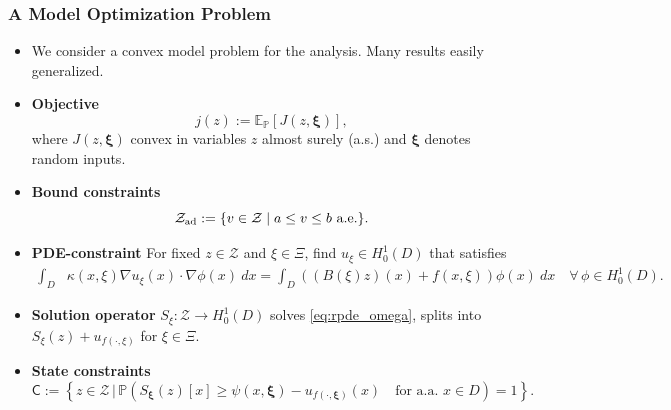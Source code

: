 \documentclass[aspectratio=169,xcolor=dvipsnames,11pt]{beamer}
\newcommand{\dd}{\:d}
\newcommand{\dif}{\dd}
\renewcommand{\Pr}{\mathbb{P}}
\newcommand{\eqdef}{:=}
\newcommand{\setC}{\mathsf{C}}
\newcommand{\setZ}{\mathcal{Z}}
\newcommand{\xibold}{\mathbold{\xi}}
\newcommand{\Ex}{\mathbb E}
\newcommand{\scrZ}{\mathcal{Z}}
\begin{document}
\begin{footnotesize}
\begin{frame}\frametitle{A Model Optimization Problem}
\begin{block}{}
\begin{itemize}
\item We consider a convex model problem for the analysis. Many results easily generalized. \pause
\item \textbf{Objective} 
\begin{equation}\label{eq:problem}
  j(z)\eqdef\Ex_{\Pr}[J(z,\xibold)],
\end{equation}
where $J(z,\xibold)$ convex in variables $z$ almost surely (a.s.)
and $\xibold$ denotes random inputs. \pause
\item \textbf{Bound constraints}\vspace{-2ex}
\begin{equation}\label{eq:Zad}
\setZ_{\rm ad} \eqdef \{v\in\scrZ\; \vert  \;a \le v \le b \text{ a.e.}\}.\vspace{-2ex}
\end{equation}\pause
\item \textbf{PDE-constraint}
For
fixed $z\in\scrZ$ and $\xi\in\Xi$, find $u_\xi \in H^1_0(D)$ that satisfies
\begin{equation}\label{eq:rpde_omega}
\begin{aligned}
 \int_{D} &\kappa(x,\xi)\nabla u_\xi(x) \cdot \nabla \phi(x) \dif x =  \int_{D} ((B(\xi)z)(x) + f(x,\xi))  \phi(x)  \dif x
 \quad\forall\,\phi\in H^1_0(D).
\end{aligned}
\end{equation} 
\item \textbf{Solution operator} 
$S_{\xi}:\scrZ\to H^{1}_{0}(D)$ solves  \eqref{eq:rpde_omega}, splits into $S_{\xi}(z)+u_{f(\cdot,\xi)}$ for $\xi\in\Xi$.\pause
\item \textbf{State constraints} 
\begin{equation}\label{eq:C}
\setC\eqdef\left\{z\in \setZ\, \vert\, \Pr\left(S_{\xibold}(z)[x]\geq\psi(x,\xibold)-u_{f(\cdot,\xibold)}(x)\quad\text{for a.a.\ }x\in D\right)=1\right\}.
\end{equation}

\end{itemize}
\end{block}
\end{frame}


\end{footnotesize}
\end{document}
